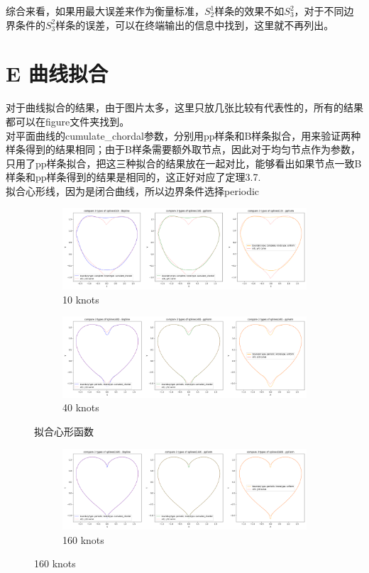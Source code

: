 \documentclass[UTF8]{ctexart}
\begin{document}
	综合来看，如果用最大误差来作为衡量标准，$S_2^1$样条的效果不如$S_3^2$，对于不同边界条件的$S_3^2$样条的误差，可以在终端输出的信息中找到，这里就不再列出。
\section{E 曲线拟合}
对于曲线拟合的结果，由于图片太多，这里只放几张比较有代表性的，所有的结果都可以在figure文件夹找到。\\
对平面曲线的cumulate\_chordal参数，分别用pp样条和B样条拟合，用来验证两种样条得到的结果相同；由于B样条需要额外取节点，因此对于均匀节点作为参数，只用了pp样条拟合，把这三种拟合的结果放在一起对比，能够看出如果节点一致B样条和pp样条得到的结果是相同的，这正好对应了定理3.7.\\
拟合心形线，因为是闭合曲线，所以边界条件选择periodic
	\begin{figure}[H]
	\centering
	\begin{subfigure}[b]{0.45\textwidth}
		\centering
		\includegraphics[width=\textwidth]{../figure/E_curve1.json_1.png}
		\caption{10 knots}
		\label{fig:image1}
	\end{subfigure}
	\hspace{0.5cm}  %
	\begin{subfigure}[b]{0.45\textwidth}
		\centering
		\includegraphics[width=\textwidth]{../figure/E_curve1.json_6.png}
		\caption{40 knots}
		\label{fig:image2}
	\end{subfigure}
	\caption{拟合心形函数}
	\label{fig:two_images}
\end{figure}
\begin{figure}[H]
	\centering
	\begin{subfigure}[b]{0.45\textwidth}
		\centering
		\includegraphics[width=\textwidth]{../figure/E_curve1.json_10.png}
		\caption{160 knots}
		\label{fig:image1}
	\end{subfigure}
\end{figure}
\end{document}
